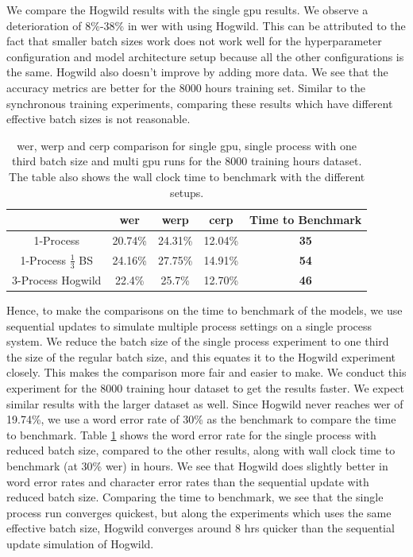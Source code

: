 We compare the Hogwild results with the single \acrshort{gpu} results. We observe a deterioration of 8\%-38\% in \acrshort{wer} with using Hogwild. This can be attributed to the fact that smaller batch sizes work does not work well for the hyperparameter configuration and model architecture setup because all the other configurations is the same. Hogwild also doesn't improve by adding more data. We see that the accuracy metrics are better for the 8000 hours training set. Similar to the synchronous training experiments, comparing these results which have different effective batch sizes is not reasonable. 

\begin{table}[ht]
\centering
\begin{tabular}{c | c c c | c }
\hline
     & \acrshort{wer} & \acrshort{werp} & \acrshort{cerp} & Time to Benchmark\\
 \hline
  1-Process & 20.74\% & 24.31\% & 12.04\% & \textbf{35} \\
  1-Process $\frac{1}{3}$ BS & 24.16\% & 27.75\% & 14.91\% & \textbf{54} \\
  3-Process Hogwild & 22.4\% & 25.7\% & 12.70\% & \textbf{46} \\
 \hline
\end{tabular}
\caption{\label{table:wer_hog_seq} \acrshort{wer}, \acrshort{werp} and \acrshort{cerp} comparison for single \acrshort{gpu}, single process with one third batch size and multi \acrshort{gpu} runs for the 8000 training hours dataset. The table also shows the wall clock time to benchmark with the different setups.}
\end{table}

Hence, to make the comparisons on the time to benchmark of the models, we use sequential updates to simulate multiple process settings on a single process system. We reduce the batch size of the single process experiment to one third the size of the regular batch size, and this equates it to the Hogwild experiment closely. This makes the comparison more fair and easier to make. We conduct this experiment for the 8000 training hour dataset to get the results faster.  We expect similar results with the larger dataset as well. Since Hogwild never reaches \acrshort{wer} of 19.74\%, we use a word error rate of 30\% as the benchmark to compare the time to benchmark. Table \ref{table:wer_hog_seq} shows the word error rate for the single process with reduced batch size, compared to the other results, along with  wall clock time to benchmark (at 30\% \acrshort{wer}) in hours. We see that Hogwild does slightly better in word error rates and character error rates than the sequential update with reduced batch size. Comparing the time to benchmark, we see that the single process run converges quickest, but along the experiments which uses the same effective batch size, Hogwild converges around 8 hrs quicker than the sequential update simulation of Hogwild. 

